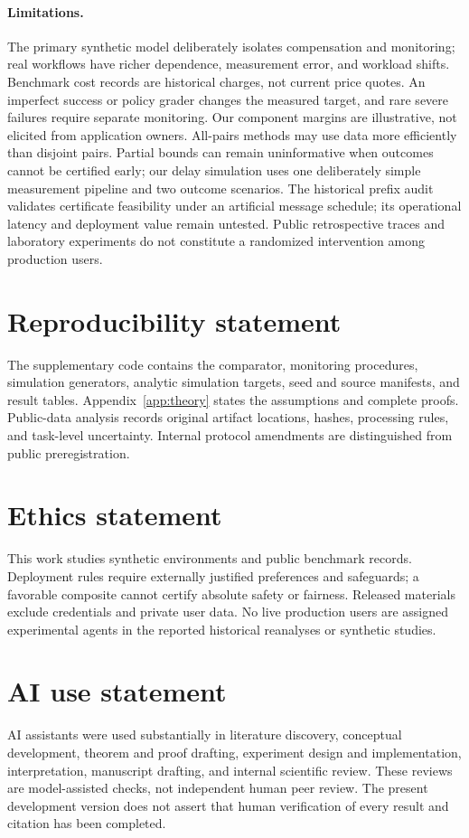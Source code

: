 \documentclass{article}
\begin{document}
\paragraph{Limitations.}
The primary synthetic model deliberately isolates compensation and
monitoring; real workflows have richer dependence, measurement error,
and workload shifts. Benchmark cost records are historical charges, not
current price quotes. An imperfect success or policy grader changes the
measured target, and rare severe failures require separate monitoring.
Our component margins are illustrative, not elicited from application
owners. All-pairs methods may use data more efficiently than disjoint
pairs. Partial bounds can remain uninformative when outcomes cannot be
certified early; our delay simulation uses one deliberately simple
measurement pipeline and two outcome scenarios. The historical prefix
audit validates certificate feasibility under an artificial message
schedule; its operational latency and deployment value remain untested. Public
retrospective traces and laboratory experiments do not constitute a
randomized intervention among production users.

\section*{Reproducibility statement}
The supplementary code contains the comparator, monitoring procedures,
simulation generators, analytic simulation targets, seed and source
manifests, and result tables. Appendix~\ref{app:theory} states the
assumptions and complete proofs. Public-data analysis records original
artifact locations, hashes, processing rules, and task-level uncertainty.
Internal protocol amendments are distinguished from public preregistration.

\section*{Ethics statement}
This work studies synthetic environments and public benchmark records.
Deployment rules require externally justified preferences and safeguards;
a favorable composite cannot certify absolute safety or fairness.
Released materials exclude credentials and private user data. No live
production users are assigned experimental agents in the reported
historical reanalyses or synthetic studies.

\section*{AI use statement}
AI assistants were used substantially in literature discovery, conceptual
development, theorem and proof drafting, experiment design and
implementation, interpretation, manuscript drafting, and internal
scientific review. These reviews are model-assisted checks, not independent
human peer review. The present development version does not assert that
human verification of every result and citation has been completed.
\end{document}
